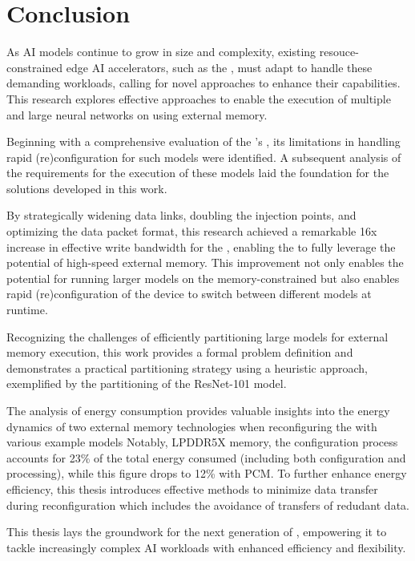 \section{Conclusion}
As AI models continue to grow in size and complexity, existing resouce-constrained edge AI accelerators, such as the \graicore{}, must adapt to handle these demanding workloads, calling for novel approaches to enhance their capabilities.
This research explores effective approaches to enable the execution of multiple and large neural networks on \graicore{} using external memory.

Beginning with a comprehensive evaluation of the \graicore{}'s \confignoc{}, its limitations in handling rapid (re)configuration for such models were identified.
A subsequent analysis of the requirements for the execution of these models laid the foundation for the solutions developed in this work.

By strategically widening data links, doubling the injection points, and optimizing the data packet format, this research achieved a remarkable 16x increase in effective write bandwidth for the \confignoc{}, enabling the \graicore{} to fully leverage the potential of high-speed external memory.
This improvement not only enables the potential for running larger models on the memory-constrained \graicore{} but also enables rapid (re)configuration of the device to switch between different models at runtime.

Recognizing the challenges of efficiently partitioning large models for external memory execution, this work provides a formal problem definition and demonstrates a practical partitioning strategy using a heuristic approach, exemplified by the partitioning of the ResNet-101 model.

The analysis of energy consumption provides valuable insights into the energy dynamics of two external memory technologies when reconfiguring the \graicore{} with various example models
Notably, LPDDR5X memory, the configuration process accounts for 23\% of the total energy consumed (including both configuration and processing), while this figure drops to 12\% with PCM.
To further enhance energy efficiency, this thesis introduces effective methods to minimize data transfer during reconfiguration which includes the avoidance of transfers of redudant data.

This thesis lays the groundwork for the next generation of \graicore{}, empowering it to tackle increasingly complex AI workloads with enhanced efficiency and flexibility.
